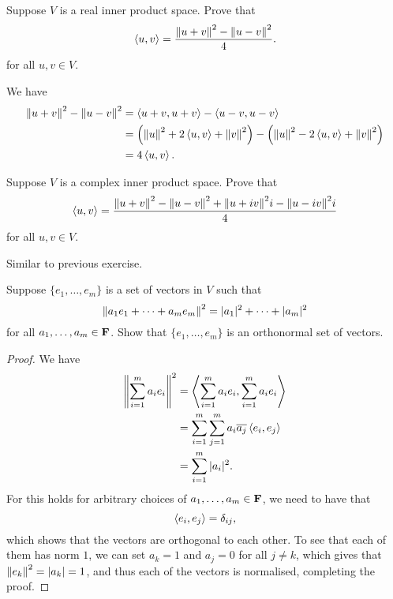 \begin{exercise}
Suppose $V$ is a real inner product space. Prove that
\[\left\langle u,v\right\rangle=\frac{\norm{u+v}^2-\norm{u-v}^2}{4}.\]
for all $u,v\in V$.
\end{exercise}

\begin{solution}
We have
\begin{align*}
\norm{u+v}^2-\norm{u-v}^2
&=\left\langle u+v,u+v\right\rangle-\left\langle u-v,u-v\right\rangle\\
&=\left(\norm{u}^2+2\left\langle u,v\right\rangle+\norm{v}^2\right)-\left(\norm{u}^2-2\left\langle u,v\right\rangle+\norm{v}^2\right)\\
&=4\left\langle u,v\right\rangle.
\end{align*}
\end{solution}

\begin{exercise}
Suppose $V$ is a complex inner product space. Prove that
\[\left\langle u,v\right\rangle=\frac{\norm{u+v}^2-\norm{u-v}^2+\norm{u+iv}^2i-\norm{u-iv}^2i}{4}\]
for all $u,v\in V$.
\end{exercise}

\begin{solution}
Similar to previous exercise.
\end{solution}

\begin{exercise}
Suppose $\{e_1,\dots,e_m\}$ is a set of vectors in $V$ such that
\[\norm{a_1e_1+\cdots+a_me_m}^2=|a_1|^2+\cdots+|a_m|^2\]
for all $a_1,\dots,a_m\in\mathbf F$. Show that $\{e_1,\dots,e_m\}$ is an orthonormal set of vectors.
\end{exercise}

\begin{proof}
We have
\begin{align*}
\norm{\sum_{i=1}^{m}a_ie_i}^2
&=\left\langle\sum_{i=1}^{m}a_ie_i,\sum_{i=1}^{m}a_ie_i\right\rangle\\
&=\sum_{i=1}^{m}\sum_{j=1}^{m}a_i\overline{a_j}\left\langle e_i,e_j\right\rangle\\
&=\sum_{i=1}^{m}|a_i|^2.
\end{align*}
For this holds for arbitrary choices of $a_1,\dots,a_m\in\mathbf F$, we need to have that
\[\left\langle e_i,e_j\right\rangle=\delta_{ij},\]
which shows that the vectors are orthogonal to each other. To see that each of them has norm $1$, we can set $a_k=1$ and $a_j=0$ for all $j\neq k$, which gives that $\norm{e_k}^2=|a_k|=1$, and thus each of the vectors is normalised, completing the proof.
\end{proof}

